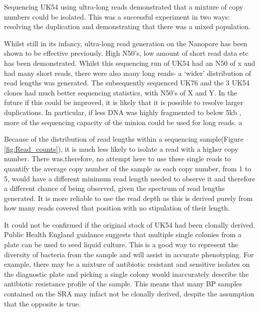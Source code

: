 \documentclass{article}
\begin{document}
Sequencing UK54 using ultra-long reads demonstrated that a mixture of copy numbers could be isolated. This was a successful experiment in two ways: resolving the duplication and demonstrating that there was a mixed population.

Whilst still in its infancy, ultra-long read generation on the Nanopore has been shown to be effective previously. High N50's, low amount of short read data etc has been demonstrated. Whilst this sequencing run of UK54 had an N50 of x and had many short reads, there were also many long reads- a `wider' distribution of read lengths was generated. The subsequently sequenced UK76 and the 3 UK54 clones had much better sequencing statistics, with N50's of X and Y. In the future if this could be improved, it is likely that it is possible to resolve larger duplications. In particular, if less DNA was highly fragmented to below 5kb , more of the sequencing capacity of the minion could be used for long reads. 
a

Because of the distribution of read lengths within a sequencing sample(Figure \ref{fig:Read_counts}), it is much less likely to isolate a read with a higher copy number. There was,therefore, no attempt here to use these single reads to quantify the average copy number of the sample as each copy number, from 1 to 5, would have a different minimum read length needed to observe it and therefore a different chance of being observed, given the spectrum of read lengths generated. It is more reliable to use the read depth as this is derived purely from how many reads covered that position with no stipulation of their length.
 


It could not be confirmed if the original stock of UK54 had been clonally derived. Public Health England guidance suggests that multiple single colonies from a plate can be used to seed liquid culture. This is a good way to represent the diversity of bacteria from the sample and will assist in accurate phenotyping. For example, there may be a mixture of antibiotic resistant and sensitive isolates on the diagnostic plate and picking a single colony would inaccurately describe the antibiotic resistance profile of the sample. This means that many BP samples contained on the SRA may infact not be clonally derived, despite the assumption that the opposite is true.
\end{document}
